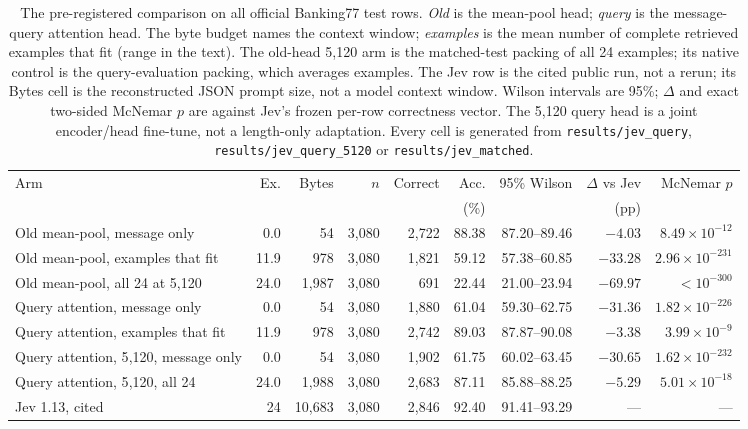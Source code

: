 \begin{table}[t]
\centering
\footnotesize
\caption{The pre-registered comparison on all \PN{} official Banking77 test rows.
\emph{Old} is the mean-pool head; \emph{query} is the message-query attention
head. The byte budget names the context window; \emph{examples} is the mean
number of complete retrieved examples that fit (range in the text). The
old-head 5{,}120 arm is the matched-test packing of all 24 examples; its native
control is the query-evaluation packing, which averages \POldTwoExamples{}
examples. The Jev row is the cited public run, not a rerun; its Bytes cell is
the reconstructed JSON prompt size, not a model context window. Wilson
intervals are 95\%; $\Delta$ and exact two-sided McNemar $p$ are against Jev's frozen
per-row correctness vector. The 5{,}120 query head is a joint encoder/head
fine-tune, not a length-only adaptation. Every cell is generated from
\texttt{results/jev\_query}, \texttt{results/jev\_query\_5120} or
\texttt{results/jev\_matched}.}
\label{tab:main}
\setlength{\tabcolsep}{3pt}
\begin{tabular}{@{}lrrrrrrrr@{}}
\toprule
Arm & Ex. & Bytes & $n$ & Correct & Acc. & 95\% Wilson & $\Delta$ vs Jev & McNemar $p$ \\
 & & & & & (\%) & & (pp) & \\
\midrule
Old mean-pool, message only & 0.0 & 54 & 3{,}080 & 2{,}722 & 88.38 & 87.20--89.46 & $-4.03$ & $8.49\times10^{-12}$ \\
Old mean-pool, examples that fit & 11.9 & 978 & 3{,}080 & 1{,}821 & 59.12 & 57.38--60.85 & $-33.28$ & $2.96\times10^{-231}$ \\
Old mean-pool, all 24 at 5{,}120 & 24.0 & 1{,}987 & 3{,}080 & 691 & 22.44 & 21.00--23.94 & $-69.97$ & $<10^{-300}$ \\
Query attention, message only & 0.0 & 54 & 3{,}080 & 1{,}880 & 61.04 & 59.30--62.75 & $-31.36$ & $1.82\times10^{-226}$ \\
Query attention, examples that fit & 11.9 & 978 & 3{,}080 & 2{,}742 & 89.03 & 87.87--90.08 & $-3.38$ & $3.99\times10^{-9}$ \\
Query attention, 5{,}120, message only & 0.0 & 54 & 3{,}080 & 1{,}902 & 61.75 & 60.02--63.45 & $-30.65$ & $1.62\times10^{-232}$ \\
Query attention, 5{,}120, all 24 & 24.0 & 1{,}988 & 3{,}080 & 2{,}683 & 87.11 & 85.88--88.25 & $-5.29$ & $5.01\times10^{-18}$ \\
Jev 1.13, cited & 24 & 10{,}683 & 3{,}080 & 2{,}846 & 92.40 & 91.41--93.29 & --- & --- \\
\bottomrule
\end{tabular}
\end{table}
